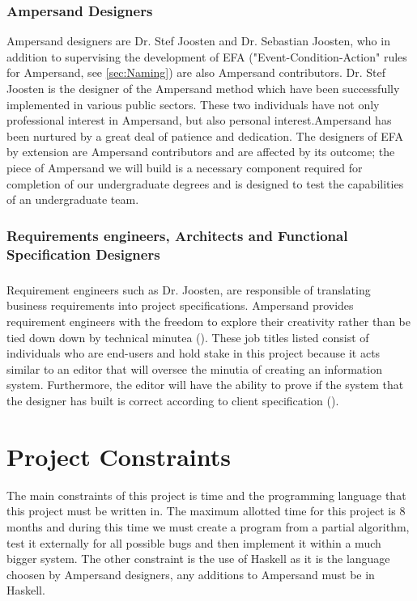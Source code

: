 \documentclass[12pt]{report}
\begin{document}
\subsection{Ampersand Designers}\label{subsec:Ampersand}
Ampersand designers are Dr. Stef Joosten and Dr. Sebastian Joosten, who in
addition to supervising the development of EFA ("Event-Condition-Action" rules
for Ampersand, see \ref{sec:Naming}) are also Ampersand
contributors.
Dr. Stef Joosten is the designer of the Ampersand method which
have been successfully implemented in various public sectors. These two 
individuals have not only professional interest in Ampersand, but also personal 
interest.Ampersand has been nurtured by a great deal of patience and
dedication. The designers of EFA by extension are Ampersand contributors and
are affected by its outcome; the piece of Ampersand we will build is a necessary
component required for completion of our undergraduate degrees and is designed 
to test the capabilities of an undergraduate team. 


\subsection{Requirements engineers, Architects and Functional Specification 
Designers}\label{subsec:BusReq}
\paragraph{}
Requirement engineers such as Dr. Joosten, are responsible of translating 
business requirements into project specifications. Ampersand provides 
requirement engineers with the freedom to explore their creativity rather than 
be tied down down by technical minutea (\cite{RBD}). These job titles listed 
consist of individuals who are 
end-users and hold stake in this project because it acts similar to an editor 
that will oversee the minutia of creating an information system. Furthermore, 
the editor will have the ability to prove if the system that the designer has 
built is correct according to client specification (\cite{applyAlg}). 


\chapter{Project Constraints}\label{ch:Constraints}
The main constraints of this project is time and the programming language that 
this project must be written in. The maximum allotted time for this project is 
8 months and during this time we must create a program from a partial 
algorithm, test it externally for all possible bugs and then implement it 
within a much bigger system. 
The other constraint is the use of Haskell as it 
is the language choosen by Ampersand designers, any additions to Ampersand must 
be in Haskell.
\end{document}
